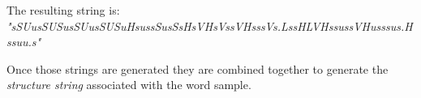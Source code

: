 The resulting string is: \newline \emph{"sSUusSUSusSUusSUSuHsussSusSsHsVHsVssVHsssVs.LssHLVHssussVHusssus.Hssuu.s"}

\vspace{3mm}

Once those strings are generated they are combined together to generate the \textit{structure string} associated with the word sample. 

